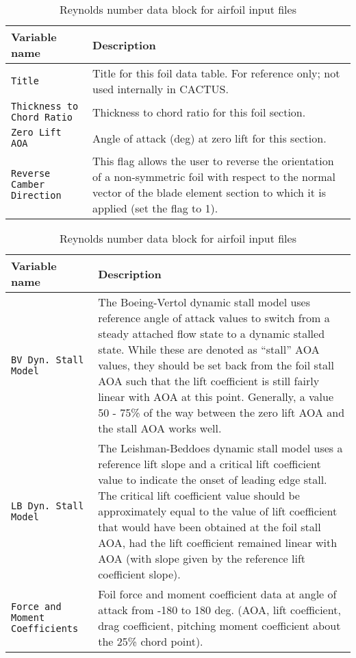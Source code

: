 \begin{table}[!htbp]
\centering
\caption{Reynolds number data block for airfoil input files}
\label{tbl:airfoil_input_header_parameters}
\begin{tabular}{p{}p{}}
\toprule
Variable name & Description \\ \midrule
\texttt{Title}                    & Title for this foil data table. For reference only; not used internally in CACTUS. \\
\texttt{Thickness to Chord Ratio} & Thickness to chord ratio for this foil section. \\
\texttt{Zero Lift AOA}            & Angle of attack (deg) at zero lift for this section. \\
\texttt{Reverse Camber Direction} & This flag allows the user to reverse the orientation of a non-symmetric foil with respect to the normal vector of the blade element section to which it is applied (set the flag to 1). \\
\bottomrule
\end{tabular}
\end{table}



\begin{table}[!htbp]
\centering
\caption{Reynolds number data block for airfoil input files}
\label{tbl:airfoil_input_re_block_parameters}
\begin{tabular}{p{}p{}}
\toprule
Variable name & Description \\ \midrule
\texttt{BV Dyn. Stall Model}           &  The Boeing-Vertol dynamic stall model uses reference angle of attack values to switch from a steady attached flow state to a dynamic stalled state. While these are denoted as ``stall'' AOA values, they should be set back from the foil stall AOA such that the lift coefficient is still fairly linear with AOA at this point. Generally, a value 50 - 75\% of the way between the zero lift AOA and the stall AOA works well. \\
\texttt{LB Dyn. Stall Model}           & The Leishman-Beddoes dynamic stall model uses a reference lift slope and a critical lift coefficient value to indicate the onset of leading edge stall. The critical lift coefficient value should be approximately equal to the value of lift coefficient that would have been obtained at the foil stall AOA, had the lift coefficient remained linear with AOA (with slope given by the reference lift coefficient slope). \\
\texttt{Force and Moment Coefficients} & Foil force and moment coefficient data at angle of attack from -180 to 180 deg. (AOA, lift coefficient, drag coefficient, pitching moment coefficient about the 25\% chord point). \\
\bottomrule
\end{tabular}
\end{table}


